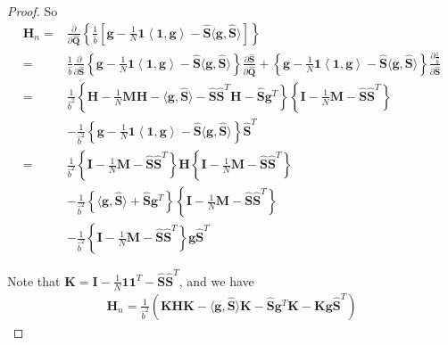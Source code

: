\documentclass[sigconf]{acmart}
\begin{document}
\begin{proof}
So
\begin{align}
    \mathbf{H}_n = & \frac{\partial }{\partial \hat{\mathbf{Q}}}\left\{\frac{1}{\hat{b}} \left[ {\mathbf{g}}-\frac{1}{N}\mathbf{1}\left\langle\mathbf{1}, {\mathbf{g}}\right\rangle-\hat{\mathbf{S}}\langle{\mathbf{g}},\hat{\mathbf{S}}\rangle\right]\right\} \nonumber\\
    = & \frac{1}{\hat{b}}\frac{\partial }{\partial \hat{\mathbf{S}}}\left\{ {\mathbf{g}}-\frac{1}{N}\mathbf{1}\left\langle\mathbf{1}, {\mathbf{g}}\right\rangle-\hat{\mathbf{S}}\langle{\mathbf{g}},\hat{\mathbf{S}}\rangle\right\}\frac{\partial \hat{\mathbf{S}}}{\partial \hat{\mathbf{Q}}} + \left\{{\mathbf{g}}-\frac{1}{N}\mathbf{1}\left\langle\mathbf{1}, {\mathbf{g}}\right\rangle-\hat{\mathbf{S}}\langle{\mathbf{g}},\hat{\mathbf{S}}\rangle\right\}\frac{\partial \frac{1}{\hat{b}}}{\partial \hat{\mathbf{S}}} \nonumber\\
    = & \frac{1}{\hat{b}^2}\left\{ \mathbf{H}-\frac{1}{N}\mathbf{M}\mathbf{H}-\langle{\mathbf{g}},\hat{\mathbf{S}}\rangle-\hat{\mathbf{S}}\hat{\mathbf{S}}^T\mathbf{H}-\hat{\mathbf{S}}{\mathbf{g}}^T\right\}\left\{\mathbf{I}-\frac{1}{N}\mathbf{M}-\hat{\mathbf{S}}\hat{\mathbf{S}}^T\right\} \nonumber\\
    & - \frac{1}{\hat{b}^2}\left\{{\mathbf{g}}-\frac{1}{N}\mathbf{1}\left\langle\mathbf{1}, {\mathbf{g}}\right\rangle-\hat{\mathbf{S}}\langle{\mathbf{g}},\hat{\mathbf{S}}\rangle\right\}\hat{\mathbf{S}}^T \nonumber\\  
    = & \frac{1}{\hat{b}^2} \left\{\mathbf{I}-\frac{1}{N}\mathbf{M}-\hat{\mathbf{S}}\hat{\mathbf{S}}^T\right\}\mathbf{H}\left\{\mathbf{I}-\frac{1}{N}\mathbf{M}-\hat{\mathbf{S}}\hat{\mathbf{S}}^T\right\}\nonumber\\
    & -\frac{1}{\hat{b}^2}\left\{\langle{\mathbf{g}},\hat{\mathbf{S}}\rangle+\hat{\mathbf{S}}{\mathbf{g}}^T\right\}\left\{\mathbf{I}-\frac{1}{N}\mathbf{M}-\hat{\mathbf{S}}\hat{\mathbf{S}}^T\right\} \nonumber\\
    & - \frac{1}{\hat{b}^2}\left\{\mathbf{I}-\frac{1}{N}\mathbf{M}-\hat{\mathbf{S}}\hat{\mathbf{S}}^T\right\}{\mathbf{g}}\hat{\mathbf{S}}^T 
 \end{align}
 
 Note that $\mathbf{K}=\mathbf{I}-\frac{1}{N}\mathbf{1}\mathbf{1}^T-\hat{\mathbf{S}}\hat{\mathbf{S}}^T$, and we have 
 \begin{align}
    \mathbf{H}_n = \frac{1}{\hat{b}^2} \left(\mathbf{K}\mathbf{H}\mathbf{K}-\langle{\mathbf{g}},\hat{\mathbf{S}}\rangle\mathbf{K}-\hat{\mathbf{S}}{\mathbf{g}}^T\mathbf{K}-\mathbf{K}{\mathbf{g}}\hat{\mathbf{S}}^T\right)
\end{align}



\end{proof}
\end{document}
